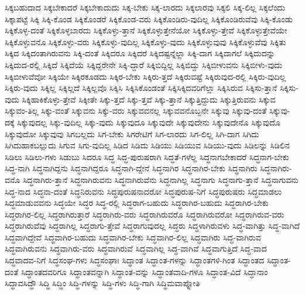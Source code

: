 {ಸಿಕ್ಕಬಹುದಾದ
ಸಿಕ್ಕಬೇಕಾದರೆ
ಸಿಕ್ಕಬೇಕಾದುದು
ಸಿಕ್ಕ-ಬೇಕು
ಸಿಕ್ಕ-ಲಾರದು
ಸಿಕ್ಕಲಾರವು
ಸಿಕ್ಕಲಿ
ಸಿಕ್ಕ-ಲಿಲ್ಲ
ಸಿಕ್ಕಲೆಂದು
ಸಿಕ್ಕಾಪಟ್ಟೆ
ಸಿಕ್ಕಿ
ಸಿಕ್ಕಿ-ಕೊಂಡ
ಸಿಕ್ಕಿಕೊಂಡರೆ
ಸಿಕ್ಕಿಕೊಂಡ-ವರು
ಸಿಕ್ಕಿಕೊಂಡಿರು-ವುದಿಲ್ಲ
ಸಿಕ್ಕಿಕೊಂಡಿರುವೆವು
ಸಿಕ್ಕಿ-ಕೊಂಡು
ಸಿಕ್ಕಿಕೊಳ್ಳ-ದಂತೆ
ಸಿಕ್ಕಿಕೊಳ್ಳಬಾರದು
ಸಿಕ್ಕಿಕೊಳ್ಳು-ತ್ತಾನೆ
ಸಿಕ್ಕಿಕೊಳ್ಳುತ್ತೇನೆಯೋ
ಸಿಕ್ಕಿಕೊಳ್ಳು-ತ್ತೇವೆ
ಸಿಕ್ಕಿಕೊಳ್ಳುತ್ತೇವೆಯೇ
ಸಿಕ್ಕಿಕೊಳ್ಳುವನೊ
ಸಿಕ್ಕಿಕೊಳ್ಳು-ವರು
ಸಿಕ್ಕಿಕೊಳ್ಳು-ವುದಿಲ್ಲ
ಸಿಕ್ಕಿಕೊಳ್ಳು-ವುದು
ಸಿಕ್ಕಿಕೊಳ್ಳುವುವು
ಸಿಕ್ಕಿಕೊಳ್ಳುವೆವು
ಸಿಕ್ಕಿತು
ಸಿಕ್ಕಿದ
ಸಿಕ್ಕಿದಂತಾಗಿರುವನು
ಸಿಕ್ಕಿ-ದಂತೆ
ಸಿಕ್ಕಿದರೂ
ಸಿಕ್ಕಿದರೆ
ಸಿಕ್ಕಿದಷ್ಟನ್ನೆಲ್ಲಾ
ಸಿಕ್ಕಿ-ದಾಗ
ಸಿಕ್ಕಿದಾಗಲೆ
ಸಿಕ್ಕಿದುದನ್ನು
ಸಿಕ್ಕಿದುದ-ರಲ್ಲಿ
ಸಿಕ್ಕಿದೆ
ಸಿಕ್ಕಿದೆಯೆ
ಸಿಕ್ಕಿದ್ದರೇನೇ
ಸಿಕ್ಕಿ-ದ್ದಾರೆ
ಸಿಕ್ಕಿಬಿದ್ದಿಲ್ಲ
ಸಿಕ್ಕಿಬಿದ್ದು
ಸಿಕ್ಕಿಬೀಳುವನು
ಸಿಕ್ಕಿಬೀಳು-ವುದು
ಸಿಕ್ಕಿಬೀಳುವೆವೋ
ಸಿಕ್ಕಿಯೇ
ಸಿಕ್ಕಿರಕೂಡದು
ಸಿಕ್ಕಿರ-ಬೇಕು
ಸಿಕ್ಕಿರು-ತ್ತದೆ
ಸಿಕ್ಕಿರುವಷ್ಟೆ
ಸಿಕ್ಕಿರುವುದ-ರಲ್ಲಿ
ಸಿಕ್ಕಿರು-ವುದಿಲ್ಲ
ಸಿಕ್ಕಿರು-ವುದು
ಸಿಕ್ಕಿಲ್ಲ
ಸಿಕ್ಕಿಲ್ಲದೆ
ಸಿಕ್ಕಿಲ್ಲವೊ
ಸಿಕ್ಕಿಸಿ
ಸಿಕ್ಕಿಸಿಕೊಂಡಂತೆ
ಸಿಕ್ಕಿಸಿಕ್ಕಿದವರಿಗೆಲ್ಲಾ
ಸಿಕ್ಕಿಸಿರುವ
ಸಿಕ್ಕಿಸು-ತ್ತಾನೆ
ಸಿಕ್ಕಿಸು-ವುದು
ಸಿಕ್ಕಿಹಾಕಿಕೊಳ್ಳು-ತ್ತೇವೆ
ಸಿಕ್ಕೀತೇ
ಸಿಕ್ಕು-ತ್ತದೆ
ಸಿಕ್ಕು-ತ್ತವೆ
ಸಿಕ್ಕು-ತ್ತಾನೆ
ಸಿಕ್ಕುತ್ತಿದ್ದುದು
ಸಿಕ್ಕುತ್ತಿರುವನು
ಸಿಕ್ಕುವ
ಸಿಕ್ಕುವಂ-ತಿಲ್ಲ
ಸಿಕ್ಕು-ವಂತೆ
ಸಿಕ್ಕುವನು
ಸಿಕ್ಕು-ವರು
ಸಿಕ್ಕುವವನಲ್ಲ
ಸಿಕ್ಕುವವನೊಬ್ಬನೇ
ಸಿಕ್ಕುವು
ಸಿಕ್ಕುವು-ದಂತೆ
ಸಿಕ್ಕುವು-ದಕ್ಕೆ
ಸಿಕ್ಕುವುದಲ್ಲ
ಸಿಕ್ಕು-ವುದಿಲ್ಲ
ಸಿಕ್ಕು-ವುದು
ಸಿಕ್ಕುವುದೂ
ಸಿಕ್ಕುವುದೇ
ಸಿಕ್ಕುವುದೇನು
ಸಿಕ್ಕುವುದೇನೊ
ಸಿಕ್ಕುವುದೊ
ಸಿಕ್ಕುವುದೋ
ಸಿಕ್ಕುವುವು
ಸಿಗಬಲ್ಲದು
ಸಿಗ-ಬೇಕು
ಸಿಗರೇಟಿಗೆ
ಸಿಗ-ಲಾರದು
ಸಿಗ-ಲಿಲ್ಲ
ಸಿಗಿ-ದಾಗ
ಸಿಗಿದು
ಸಿಗಿದುಹಾಕಬಲ್ಲುದು
ಸಿಗುವ
ಸಿಗು-ವುದಿಲ್ಲ
ಸಿಡಿದ
ಸಿಡಿದು
ಸಿಡಿಯು
ಸಿಡಿಯುವ
ಸಿಡಿಯು-ವುದು
ಸಿಡಿಲನ್ನು
ಸಿಡಿಲಿನ
ಸಿಡಿಲು
ಸಿಡಿಲು-ಗಳು
ಸಿಡುಬು
ಸಿದರೂ
ಸಿದ್ಧ
ಸಿದ್ಧ-ಪುರುಷರಾಗಿ
ಸಿದ್ಧತೆ-ಗಳೆಲ್ಲ
ಸಿದ್ಧನಾಗಬೇಕಾದರೆ
ಸಿದ್ಧನಾಗ-ಬೇಕು
ಸಿದ್ಧ-ನಾಗಿ
ಸಿದ್ಧನಾಗಿದ್ದನು
ಸಿದ್ಧನಾಗಿದ್ದರೂ
ಸಿದ್ಧನಾಗಿ-ದ್ದೇನೆ
ಸಿದ್ಧನಾಗಿರ
ಸಿದ್ಧನಾಗಿರ-ಬೇಕು
ಸಿದ್ಧನಾಗಿರು
ಸಿದ್ಧನಾಗಿರು-ವನೊ
ಸಿದ್ಧನಾಗಿರು-ತ್ತಾನೆ
ಸಿದ್ಧನಾಗಿರುವನು
ಸಿದ್ಧನಾಗಿರುವೆನು
ಸಿದ್ಧನಾಗಿಲ್ಲ
ಸಿದ್ಧನಾಗು
ಸಿದ್ಧನಾಗು-ತ್ತಾನೆ
ಸಿದ್ಧನಾಗುವನು
ಸಿದ್ಧ-ನಾದ
ಸಿದ್ಧನಾ-ದಂತೆ
ಸಿದ್ಧನಿರುವನು
ಸಿದ್ಧಪುರುಷನಾದರೋ
ಸಿದ್ಧಪುರುಷ-ನಿಗೆ
ಸಿದ್ಧಪುರುಷರು
ಸಿದ್ಧಮಾಡಲು
ಸಿದ್ಧಮಾಡುವವನು
ಸಿದ್ಧಯೇ
ಸಿದ್ಧರ
ಸಿದ್ಧ-ರಲ್ಲಿ
ಸಿದ್ಧರಾಗ-ಬಹುದು
ಸಿದ್ಧರಾಗಿರ-ಬಹುದು
ಸಿದ್ಧರಾಗಿರ-ಬೇಕು
ಸಿದ್ಧರಾಗಿರ-ಲಿಲ್ಲ
ಸಿದ್ಧರಾಗಿರುತ್ತಾರೆ
ಸಿದ್ಧರಾಗಿರು-ವರು
ಸಿದ್ಧರಾಗಿರುವರೊ
ಸಿದ್ಧರಾಗಿರುವರೋ
ಸಿದ್ಧರಾಗಿರುವ-ವರು
ಸಿದ್ಧರಾಗಿರುವೆವು
ಸಿದ್ಧರಾಗಿಲ್ಲ
ಸಿದ್ಧರಾಗು-ತ್ತೇವೆ
ಸಿದ್ಧರಾಗುವುದಲ್ಲ
ಸಿದ್ಧರು
ಸಿದ್ಧಳಾಗಿರುವಳು
ಸಿದ್ಧ-ವಾಗಿತ್ತು
ಸಿದ್ಧ-ವಾಗಿದೆ
ಸಿದ್ಧವಾಗಿದ್ದೇವೆ
ಸಿದ್ಧವಾಗಿರ-ಬಹುದು
ಸಿದ್ಧವಾಗಿರ-ಬೇಕು
ಸಿದ್ಧವಾಗಿರ-ಲಿಲ್ಲ
ಸಿದ್ಧವಾಗಿರು
ಸಿದ್ಧ-ವಾಗಿರುವ
ಸಿದ್ಧವಾಗಿರುವನು
ಸಿದ್ಧವಾಗಿರು-ವರು
ಸಿದ್ಧವಾಗಿರುವೆ
ಸಿದ್ಧವಾಗಿಲ್ಲ
ಸಿದ್ಧ-ವಾಗಿವೆ
ಸಿದ್ಧವಾಗುತ್ತಿದೆ
ಸಿದ್ಧ-ವಾದ
ಸಿದ್ಧವಾದವ-ನಿಗೆ
ಸಿದ್ಧಸಂಘ-ಗಳು
ಸಿದ್ಧಸಂಘಾಃ
ಸಿದ್ಧಾಂತ
ಸಿದ್ಧಾಂತ-ಗಳನ್ನು
ಸಿದ್ಧಾಂತಗಳಿ-ಗಿಂತ
ಸಿದ್ಧಾಂತದ
ಸಿದ್ಧಾಂತ-ದಂತೆ
ಸಿದ್ಧಾಂತದವರಿಗೂ
ಸಿದ್ಧಾಂತವನ್ನಾಗಿ
ಸಿದ್ಧಾಂತ-ವನ್ನು
ಸಿದ್ಧಾಂತವಾದಿ-ಗಳೂ
ಸಿದ್ಧಾಂತ-ವಿದೆ
ಸಿದ್ಧಾನಾಂ
ಸಿದ್ಧಾವಸಿದ್ಧೌ
ಸಿದ್ಧಿ
ಸಿದ್ಧಿಂ
ಸಿದ್ಧಿ-ಗಳನ್ನು
ಸಿದ್ಧಿ-ಗಳು
ಸಿದ್ಧಿ-ಗಾಗಿ
ಸಿದ್ಧಿಮವಾಪ್ನೋತಿ
}
